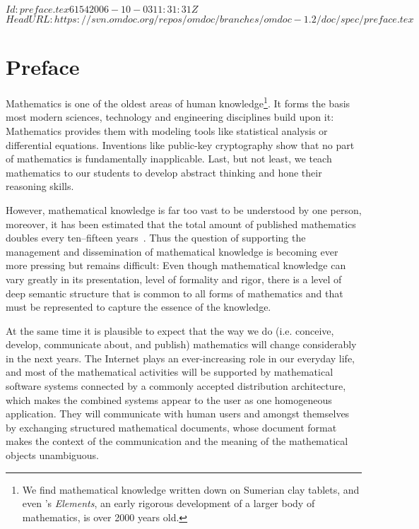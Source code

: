 \svnInfo $Id: preface.tex 6154 2006-10-03 11:31:31Z  $
\svnKeyword $HeadURL: https://svn.omdoc.org/repos/omdoc/branches/omdoc-1.2/doc/spec/preface.tex $

\section*{Preface}\label{sec:intro}

Mathematics is one of the oldest areas of human knowledge\footnote{We find mathematical
  knowledge written down on Sumerian clay tablets, and even
  {}'s {\emph{Elements}}, an early rigorous
  development of a larger body of mathematics, is over 2000 years old.}.  It forms the
basis most modern sciences, technology and engineering disciplines build upon
it: Mathematics provides them with modeling tools like statistical analysis or
differential equations.  Inventions like public-key cryptography show that no part of
mathematics is fundamentally inapplicable.  Last, but not least, we teach mathematics to
our students to develop abstract thinking and hone their reasoning skills.
  
However, mathematical knowledge is far too vast to be understood by one person, moreover,
it has been estimated that the total amount of published mathematics doubles every
ten--fifteen years~\cite{Odlyzko:tlogr95}. Thus the question of supporting the management
and dissemination of mathematical
knowledge
is becoming ever more pressing but remains difficult: Even though mathematical knowledge
can vary greatly in its presentation, level of formality and rigor, there is a level of
deep semantic structure that is common to all forms of mathematics and that must be
represented to capture the essence of the knowledge.

At the same time it is plausible to expect that the way we do (i.e. conceive, develop,
communicate about, and publish) mathematics will change considerably in the next years.
The Internet plays an ever-increasing role in our everyday life, and most of the
mathematical activities will be supported by mathematical software systems connected by a
commonly accepted distribution architecture, which makes the combined systems appear to the
user as one homogeneous application. They will communicate with human users and amongst
themselves by exchanging structured mathematical documents, whose document format makes
the context of the communication and the meaning of the mathematical objects unambiguous.


